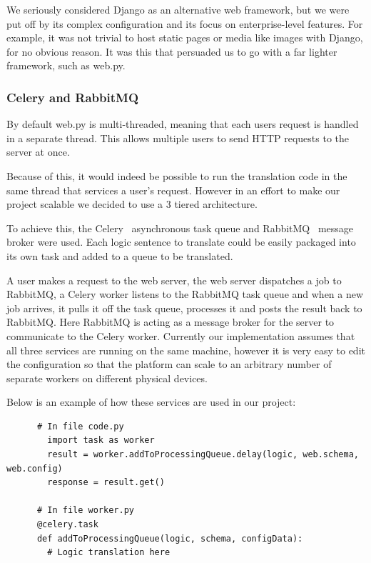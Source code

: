 \documentclass[a4paper, 11pt]{article}
\begin{document}
      We seriously considered Django as an alternative web framework, but we
      were put off by its complex configuration and its focus on
      enterprise-level features. For example, it was not trivial to host static
      pages or media like images with Django, for no obvious reason. It was this
      that persuaded us to go with a far lighter framework, such as web.py.

    \subsubsection{Celery and RabbitMQ}
      By default web.py is multi-threaded, meaning that each users request is
      handled in a separate thread. This allows multiple users to send HTTP
      requests to the server at once.

      Because of this, it would indeed be possible to run the translation code
      in the same thread that services a user's request. However in an effort
      to make our project scalable we decided to use a 3 tiered architecture.

      To achieve this, the Celery~\cite{celery} asynchronous task queue and
      RabbitMQ~\cite{rabbitmq} message broker were used. Each logic sentence to
      translate could be easily packaged into its own task and added to a queue
      to be translated.

      A user makes a request to the web server, the web server dispatches a job
      to RabbitMQ, a Celery worker listens to the RabbitMQ task queue and when a
      new job arrives, it pulls it off the task queue, processes it and posts
      the result back to RabbitMQ. Here RabbitMQ is acting as a message broker
      for the server to communicate to the Celery worker. Currently our
      implementation assumes that all three services are running on the same
      machine, however it is very easy to edit the configuration so that the
      platform can scale to an arbitrary number of separate workers on different
      physical devices.

      Below is an example of how these services are used in our project:
      \begin{verbatim}
      # In file code.py
        import task as worker
        result = worker.addToProcessingQueue.delay(logic, web.schema, web.config)
        response = result.get()

      # In file worker.py
      @celery.task
      def addToProcessingQueue(logic, schema, configData):
        # Logic translation here
      \end{verbatim}
\end{document}
